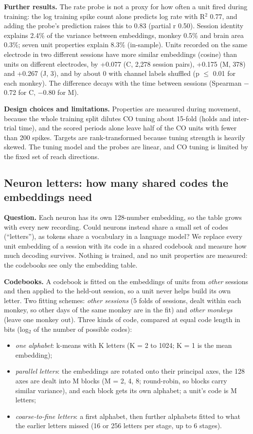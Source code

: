 \documentclass[11pt]{article}
\begin{document}
\textbf{Further results.} The rate probe is not a proxy for how often a unit fired during training: the log training spike count alone predicts log rate with R$^{2}$ 0.77, and adding the probe's prediction raises this to 0.83 (partial r 0.50). Session identity explains 2.4\% of the variance between embeddings, monkey 0.5\% and brain area 0.3\%; seven unit properties explain 8.3\% (in-sample). Units recorded on the same electrode in two different sessions have more similar embeddings (cosine) than units on different electrodes, by +0.077 (C, 2,278 session pairs), +0.175 (M, 378) and +0.267 (J, 3), and by about 0 with channel labels shuffled (p $\leq$ 0.01 for each monkey). The difference decays with the time between sessions (Spearman $-$0.72 for C, $-$0.80 for M).

\textbf{Design choices and limitations.} Properties are measured during movement, because the whole training split dilutes CO tuning about 15-fold (holds and inter-trial time), and the scored periods alone leave half of the CO units with fewer than 200 spikes. Targets are rank-transformed because tuning strength is heavily skewed. The tuning model and the probes are linear, and CO tuning is limited by the fixed set of reach directions.

\subsection{Neuron letters: how many shared codes the embeddings need}

\textbf{Question.} Each neuron has its own 128-number embedding, so the table grows with every new recording. Could neurons instead share a small set of codes (``letters''), as tokens share a vocabulary in a language model? We replace every unit embedding of a session with its code in a shared codebook and measure how much decoding survives. Nothing is trained, and no unit properties are measured: the codebooks see only the embedding table.

\textbf{Codebooks.} A codebook is fitted on the embeddings of units from \emph{other} sessions and then applied to the held-out session, so a unit never helps build its own letter. Two fitting schemes: \emph{other sessions} (5 folds of sessions, dealt within each monkey, so other days of the same monkey are in the fit) and \emph{other monkeys} (leave one monkey out). Three kinds of code, compared at equal code length in bits (log$_2$ of the number of possible codes):

\begin{itemize}
\item \emph{one alphabet}: k-means with K letters (K = 2 to 1024; K = 1 is the mean embedding);
\item \emph{parallel letters}: the embeddings are rotated onto their principal axes, the 128 axes are dealt into M blocks (M = 2, 4, 8; round-robin, so blocks carry similar variance), and each block gets its own alphabet; a unit's code is M letters;
\item \emph{coarse-to-fine letters}: a first alphabet, then further alphabets fitted to what the earlier letters missed (16 or 256 letters per stage, up to 6 stages).
\end{itemize}
\end{document}
